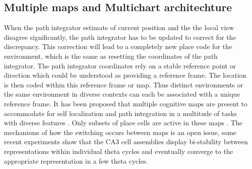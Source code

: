 \subsection{Multiple maps and Multichart architechture}
\label{multichart}
When the path integrator estimate of current position and the the local view disagree significantly, the path integrator has to be updated to correct for the discrepancy. This correction will lead to a completely new place code for the environment, which is the same as resetting the coordinates of the path integrator. The path integrator coordinates rely on a stable reference point or direction which could be understood as providing a reference frame. The location is then coded within this reference frame or map. Thus distinct environments or the same environment in diverse contexts can each be associated with a unique reference frame. It has been proposed that multiple cognitive maps are present to accommodate for self localization and path integration in a multitude of tasks with diverse features \cite{Street}. Only subsets of place cells are active in these maps \cite{Muller1987}. The mechanisms of how the switching occurs between maps is an open issue, some recent experiments show that the CA3 cell assemblies display bi-stability between representations within individual theta cycles\cite{Jezek2011} and eventually converge to the appropriate representation in a few theta cycles.\\
 
